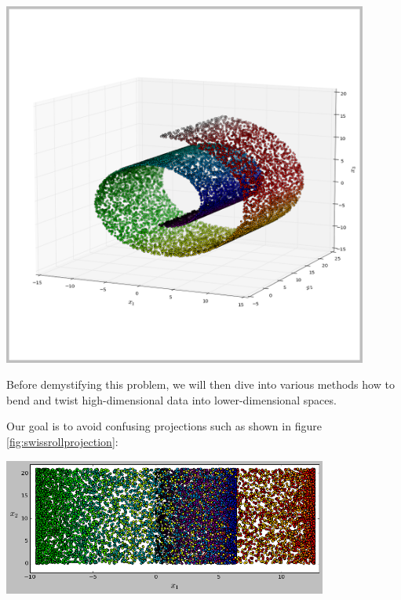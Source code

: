 \noindent
\begin{minipage}[c]{0.4\linewidth}
%
\vspace*{6mm}
\begin{center}
	\includegraphics[width=0.9\textwidth]{external_content/graphs/swiss_roll.png}
	\captionsetup{justification=centering,type=htypei}
	\label{fig:swissrollfull}
\end{center}
%
\end{minipage}\hfill%
\begin{minipage}[c]{0.55\linewidth}
Before demystifying this problem, we will then dive into various methods how to bend and twist high-dimensional data into lower-dimensional spaces.

Our goal is to avoid confusing projections such as shown in figure \ref{fig:swissrollprojection}:

\begin{center}
	\includegraphics[width=0.8\textwidth]{external_content/graphs/swiss_roll-projection.png}
	\captionsetup{justification=centering,type=htypei}
	\label{fig:swissrollprojection}
\end{center}
\end{minipage}%
